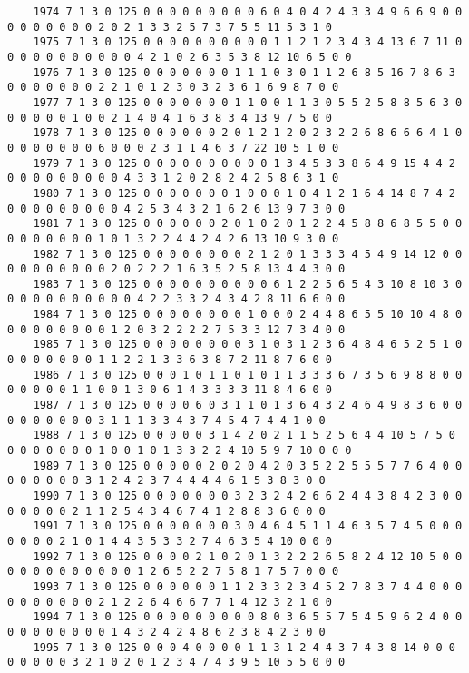 \begin{landscape}
{\begin{verbatim}
	1974 7 1 3 0 125 0 0 0 0 0 0 0 0 0 6 0 4 0 4 2 4 3 3 4 9 6 6 9 0 0 0 0 0 0 0 0 0 2 0 2 1 3 3 2 5 7 3 7 5 5 11 5 3 1 0
	1975 7 1 3 0 125 0 0 0 0 0 0 0 0 0 0 1 1 2 1 2 3 4 3 4 13 6 7 11 0 0 0 0 0 0 0 0 0 0 0 4 2 1 0 2 6 3 5 3 8 12 10 6 5 0 0
	1976 7 1 3 0 125 0 0 0 0 0 0 0 1 1 1 0 3 0 1 1 2 6 8 5 16 7 8 6 3 0 0 0 0 0 0 0 2 2 1 0 1 2 3 0 3 2 3 6 1 6 9 8 7 0 0
	1977 7 1 3 0 125 0 0 0 0 0 0 0 1 1 0 0 1 1 3 0 5 5 2 5 8 8 5 6 3 0 0 0 0 0 0 1 0 0 2 1 4 0 4 1 6 3 8 3 4 13 9 7 5 0 0
	1978 7 1 3 0 125 0 0 0 0 0 0 2 0 1 2 1 2 0 2 3 2 2 6 8 6 6 6 4 1 0 0 0 0 0 0 0 0 6 0 0 0 2 3 1 1 4 6 3 7 22 10 5 1 0 0
	1979 7 1 3 0 125 0 0 0 0 0 0 0 0 0 0 1 3 4 5 3 3 8 6 4 9 15 4 4 2 0 0 0 0 0 0 0 0 0 4 3 3 1 2 0 2 8 2 4 2 5 8 6 3 1 0
	1980 7 1 3 0 125 0 0 0 0 0 0 0 1 0 0 0 1 0 4 1 2 1 6 4 14 8 7 4 2 0 0 0 0 0 0 0 0 0 4 2 5 3 4 3 2 1 6 2 6 13 9 7 3 0 0
	1981 7 1 3 0 125 0 0 0 0 0 0 2 0 1 0 2 0 1 2 2 4 5 8 8 6 8 5 5 0 0 0 0 0 0 0 0 0 1 0 1 3 2 2 4 4 2 4 2 6 13 10 9 3 0 0
	1982 7 1 3 0 125 0 0 0 0 0 0 0 0 2 1 2 0 1 3 3 3 4 5 4 9 14 12 0 0 0 0 0 0 0 0 0 0 2 0 2 2 2 1 6 3 5 2 5 8 13 4 4 3 0 0
	1983 7 1 3 0 125 0 0 0 0 0 0 0 0 0 0 6 1 2 2 5 6 5 4 3 10 8 10 3 0 0 0 0 0 0 0 0 0 0 0 4 2 2 3 3 2 4 3 4 2 8 11 6 6 0 0
	1984 7 1 3 0 125 0 0 0 0 0 0 0 0 1 0 0 0 2 4 4 8 6 5 5 10 10 4 8 0 0 0 0 0 0 0 0 0 1 2 0 3 2 2 2 2 7 5 3 3 12 7 3 4 0 0
	1985 7 1 3 0 125 0 0 0 0 0 0 0 0 3 1 0 3 1 2 3 6 4 8 4 6 5 2 5 1 0 0 0 0 0 0 0 0 1 1 2 2 1 3 3 6 3 8 7 2 11 8 7 6 0 0
	1986 7 1 3 0 125 0 0 0 1 0 1 1 0 1 0 1 1 3 3 3 6 7 3 5 6 9 8 8 0 0 0 0 0 0 0 1 1 0 0 1 3 0 6 1 4 3 3 3 3 11 8 4 6 0 0
	1987 7 1 3 0 125 0 0 0 0 6 0 3 1 1 0 1 3 6 4 3 2 4 6 4 9 8 3 6 0 0 0 0 0 0 0 0 0 3 1 1 1 3 3 4 3 7 4 5 4 7 4 4 1 0 0
	1988 7 1 3 0 125 0 0 0 0 0 3 1 4 2 0 2 1 1 5 2 5 6 4 4 10 5 7 5 0 0 0 0 0 0 0 0 1 0 0 1 0 1 3 3 2 2 4 10 5 9 7 10 0 0 0
	1989 7 1 3 0 125 0 0 0 0 0 2 0 2 0 4 2 0 3 5 2 2 5 5 5 7 7 6 4 0 0 0 0 0 0 0 0 3 1 2 4 2 3 7 4 4 4 4 6 1 5 3 8 3 0 0
	1990 7 1 3 0 125 0 0 0 0 0 0 0 3 2 3 2 4 2 6 6 2 4 4 3 8 4 2 3 0 0 0 0 0 0 0 2 1 1 2 5 4 3 4 6 7 4 1 2 8 8 3 6 0 0 0
	1991 7 1 3 0 125 0 0 0 0 0 0 0 3 0 4 6 4 5 1 1 4 6 3 5 7 4 5 0 0 0 0 0 0 0 2 1 0 1 4 4 3 5 3 3 2 7 4 6 3 5 4 10 0 0 0
	1992 7 1 3 0 125 0 0 0 0 2 1 0 2 0 1 3 2 2 2 6 5 8 2 4 12 10 5 0 0 0 0 0 0 0 0 0 0 0 0 1 2 6 5 2 2 7 5 8 1 7 5 7 0 0 0
	1993 7 1 3 0 125 0 0 0 0 0 0 1 1 2 3 3 2 3 4 5 2 7 8 3 7 4 4 0 0 0 0 0 0 0 0 0 0 2 1 2 2 6 4 6 6 7 7 1 4 12 3 2 1 0 0
	1994 7 1 3 0 125 0 0 0 0 0 0 0 0 0 8 0 3 6 5 5 7 5 4 5 9 6 2 4 0 0 0 0 0 0 0 0 0 0 1 4 3 2 4 2 4 8 6 2 3 8 4 2 3 0 0
	1995 7 1 3 0 125 0 0 0 4 0 0 0 0 1 1 3 1 2 4 4 3 7 4 3 8 14 0 0 0 0 0 0 0 0 3 2 1 0 2 0 1 2 3 4 7 4 3 9 5 10 5 5 0 0 0

\end{verbatim}}
\end{landscape}
